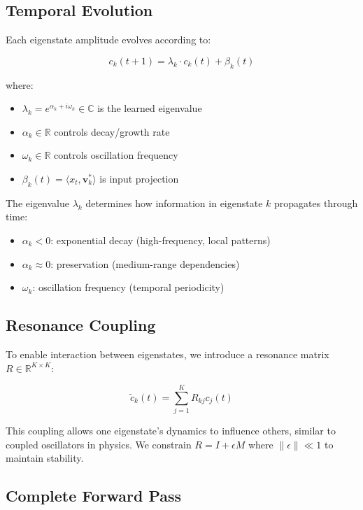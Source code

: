 \documentclass[11pt,letterpaper]{article}
\newcommand{\R}{\mathbb{R}}
\newcommand{\C}{\mathbb{C}}
\newcommand{\inner}[2]{\langle #1, #2 \rangle}
\begin{document}
\subsection{Temporal Evolution}

Each eigenstate amplitude evolves according to:

\begin{equation}
\label{eq:evolution}
    c_k(t+1) = \lambda_k \cdot c_k(t) + \beta_k(t)
\end{equation}

where:
\begin{itemize}
    \item $\lambda_k = e^{\alpha_k + i\omega_k} \in \C$ is the learned eigenvalue
    \item $\alpha_k \in \R$ controls decay/growth rate
    \item $\omega_k \in \R$ controls oscillation frequency
    \item $\beta_k(t) = \inner{x_t}{\mathbf{v}_k^*}$ is input projection
\end{itemize}

The eigenvalue $\lambda_k$ determines how information in eigenstate $k$ propagates through time:
\begin{itemize}
    \item $\alpha_k < 0$: exponential decay (high-frequency, local patterns)
    \item $\alpha_k \approx 0$: preservation (medium-range dependencies)
    \item $\omega_k$: oscillation frequency (temporal periodicity)
\end{itemize}

\subsection{Resonance Coupling}

To enable interaction between eigenstates, we introduce a resonance matrix $R \in \R^{K \times K}$:

\begin{equation}
    \tilde{c}_k(t) = \sum_{j=1}^{K} R_{kj} c_j(t)
\end{equation}

This coupling allows one eigenstate's dynamics to influence others, similar to coupled oscillators in physics. We constrain $R = I + \epsilon M$ where $\|\epsilon\| \ll 1$ to maintain stability.

\subsection{Complete Forward Pass}
\end{document}
